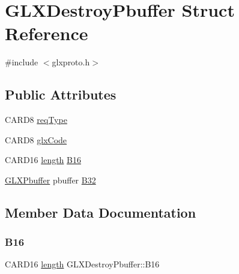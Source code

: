 \hypertarget{struct_g_l_x_destroy_pbuffer}{}\section{G\+L\+X\+Destroy\+Pbuffer Struct Reference}
\label{struct_g_l_x_destroy_pbuffer}


{\ttfamily \#include $<$glxproto.\+h$>$}

\subsection*{Public Attributes}
\begin{DoxyCompactItemize}
\item 
C\+A\+R\+D8 \hyperlink{struct_g_l_x_destroy_pbuffer_abee425bf043cf7f2dd2a933255376d82}{req\+Type}
\item 
C\+A\+R\+D8 \hyperlink{struct_g_l_x_destroy_pbuffer_a9ff7d59613411825f123453b6f14f6e7}{glx\+Code}
\item 
C\+A\+R\+D16 \hyperlink{glcorearb_8h_ab9c919755bde3b34349e23a32b4e0fa7}{length} \hyperlink{struct_g_l_x_destroy_pbuffer_a65770a8606abd8062b99b6f3520bc36d}{B16}
\item 
\hyperlink{glx_8h_a0e12899d42d3570d659900a17247cb71}{G\+L\+X\+Pbuffer} pbuffer \hyperlink{struct_g_l_x_destroy_pbuffer_a2a7736d7f7f300d36a362f8d06d0f990}{B32}
\end{DoxyCompactItemize}


\subsection{Member Data Documentation}
\mbox{\label{struct_g_l_x_destroy_pbuffer_a65770a8606abd8062b99b6f3520bc36d}} 
\subsubsection{\texorpdfstring{B16}{B16}}
{\footnotesize\ttfamily C\+A\+R\+D16 \hyperlink{glcorearb_8h_ab9c919755bde3b34349e23a32b4e0fa7}{length} G\+L\+X\+Destroy\+Pbuffer\+::\+B16}

\mbox{\label{struct_g_l_x_destroy_pbuffer_a2a7736d7f7f300d36a362f8d06d0f990}} 
